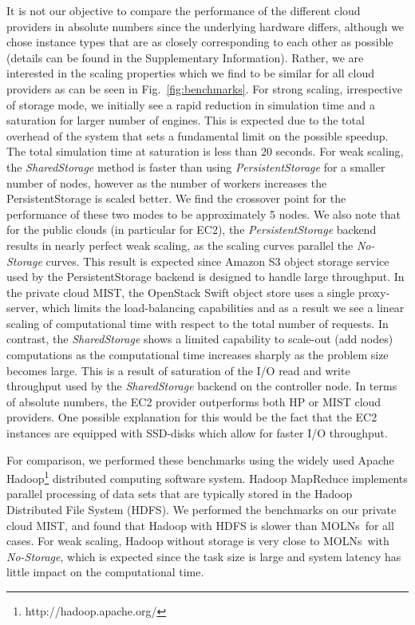 \documentclass[final,leqno,onefignum,onetabnum]{siamltex1213}
\def\packagename {MOLNs}
\begin{document}
It is not our objective to compare the performance of the different cloud providers in absolute numbers since the underlying hardware differs, although we chose instance types that are as closely corresponding to each other as possible (details can be found in the Supplementary Information). Rather, we are interested in the scaling properties which we find to be similar for all cloud providers as can be seen in Fig.~\ref{fig:benchmarks}. For strong scaling, irrespective of storage mode, we initially see a rapid reduction in simulation time and a saturation for larger number of engines. This is expected due to the total overhead of the system that sets a fundamental limit on the possible speedup. The total simulation time at saturation is less than 20 seconds. For weak scaling, the \emph{SharedStorage} method is faster than using \emph{PersistentStorage} for a smaller number of nodes, however as the number of workers increases the PersistentStorage is scaled better. We find the crossover point for the performance of these two modes to be approximately 5 nodes. We also note that for the public clouds (in particular for EC2), the \emph{PersistentStorage} backend results in nearly perfect weak scaling, as the scaling curves parallel the \emph{No-Storage} curves. This result is expected since Amazon S3 object storage service used by the PersistentStorage backend is designed to handle large throughput. In the private cloud MIST, the OpenStack Swift object store uses a single proxy-server, which limits the load-balancing capabilities and as a result we see a linear scaling of computational time with respect to the total number of requests. In contrast, the \emph{SharedStorage} shows a limited capability to scale-out (add nodes) computations as the computational time increases sharply as the problem size becomes large.  This is a result of saturation of the I/O read and write throughput used by the \emph{SharedStorage} backend on the controller node. In terms of absolute numbers, the EC2 provider outperforms both HP or MIST cloud providers. One possible explanation for this would be the fact that the EC2 instances are equipped with SSD-disks which allow for faster I/O throughput. 


For comparison, we performed these benchmarks using the widely used Apache Hadoop\footnote{http://hadoop.apache.org/} distributed computing software system.  Hadoop MapReduce implements parallel processing of data sets that are typically stored in the Hadoop Distributed File System (HDFS).  We performed the benchmarks on our private cloud MIST, and found that Hadoop with HDFS is slower than \packagename~for all cases. For weak scaling, Hadoop without storage is very close to \packagename~with \emph{No-Storage}, which is expected since the task size is large and system latency has little impact on the computational time. 
\end{document}
